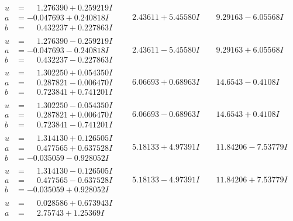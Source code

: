 \documentclass[1p]{elsarticle_modified}
\theoremstyle{definition}
\begin{document}
$$\begin{array}{c|c|c}
\begin{aligned}
u &= \phantom{-}1.276390 + 0.259219 I \\
a &= -0.047693 + 0.240818 I \\
b &= \phantom{-}0.432237 + 0.227863 I\end{aligned}
 & \phantom{-}2.43611 + 5.45580 I & \phantom{-}9.29163 - 6.05568 I \\ \hline\begin{aligned}
u &= \phantom{-}1.276390 - 0.259219 I \\
a &= -0.047693 - 0.240818 I \\
b &= \phantom{-}0.432237 - 0.227863 I\end{aligned}
 & \phantom{-}2.43611 - 5.45580 I & \phantom{-}9.29163 + 6.05568 I \\ \hline\begin{aligned}
u &= \phantom{-}1.302250 + 0.054350 I \\
a &= \phantom{-}0.287821 - 0.006470 I \\
b &= \phantom{-}0.723841 + 0.741201 I\end{aligned}
 & \phantom{-}6.06693 + 0.68963 I & \phantom{-}14.6543 - 0.4108 I \\ \hline\begin{aligned}
u &= \phantom{-}1.302250 - 0.054350 I \\
a &= \phantom{-}0.287821 + 0.006470 I \\
b &= \phantom{-}0.723841 - 0.741201 I\end{aligned}
 & \phantom{-}6.06693 - 0.68963 I & \phantom{-}14.6543 + 0.4108 I \\ \hline\begin{aligned}
u &= \phantom{-}1.314130 + 0.126505 I \\
a &= \phantom{-}0.477565 + 0.637528 I \\
b &= -0.035059 - 0.928052 I\end{aligned}
 & \phantom{-}5.18133 + 4.97391 I & \phantom{-}11.84206 - 7.53779 I \\ \hline\begin{aligned}
u &= \phantom{-}1.314130 - 0.126505 I \\
a &= \phantom{-}0.477565 - 0.637528 I \\
b &= -0.035059 + 0.928052 I\end{aligned}
 & \phantom{-}5.18133 - 4.97391 I & \phantom{-}11.84206 + 7.53779 I \\ \hline\begin{aligned}
u &= \phantom{-}0.028586 + 0.673943 I \\
a &= \phantom{-}2.75743 + 1.25369 I \\

\end{aligned}
\end{array}$$
\end{document}
